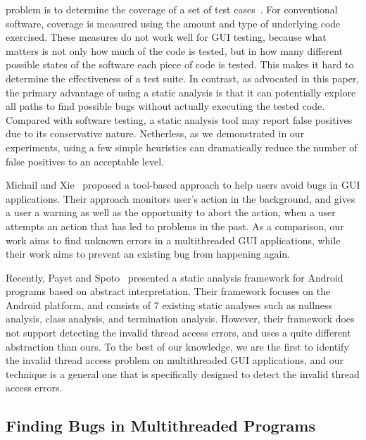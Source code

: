 problem is to determine the coverage of a set of test
cases~\cite{MemonFSE2001}. For conventional software, coverage is measured
using the amount and type of underlying code exercised.
These measures do not work well for GUI testing, because
what matters is not only how much of the code is tested,
but in how many different possible states of the software
each piece of code is tested. This makes it hard to determine
the effectiveness of a test suite. %
In contrast, as advocated in this paper, the primary advantage of
using a static analysis is that it can potentially explore
all paths to find possible bugs without actually executing the tested code. %
Compared with software testing, a static analysis tool may
report false positives due to its conservative nature. Netherless,
as we demonstrated in our experiments, using a few simple heuristics
can dramatically reduce the number of false positives  to
an acceptable level.


Michail and Xie~\cite{michail05:helping} proposed a tool-based approach to help users avoid bugs
in GUI applications. Their approach monitors user's action in the background,
and gives a user a warning as well as the opportunity to abort the action, when
a user attempts an action that has led to problems in the past. 
As a comparison, our work aims to find unknown errors in a multithreaded
GUI applications, while their work aims to prevent an existing bug
from happening again.


Recently, Payet and Spoto~\cite{Payet:2011:SAA:2032266.2032299} presented a static
analysis framework for Android programs based on  abstract
interpretation. Their framework focuses on the Android platform, and
 consists of 7 existing static analyses such as
nullness analysis, class analysis, and termination analysis.  However,
their framework does not support detecting the invalid thread access
errors, and uses a quite different abstraction than ours.
To the best of our knowledge, we are the first to identify the invalid
thread access problem on multithreaded GUI applications, and
our technique is a general one that is specifically designed to detect
the invalid thread access errors.


\subsection{Finding Bugs in Multithreaded Programs}




